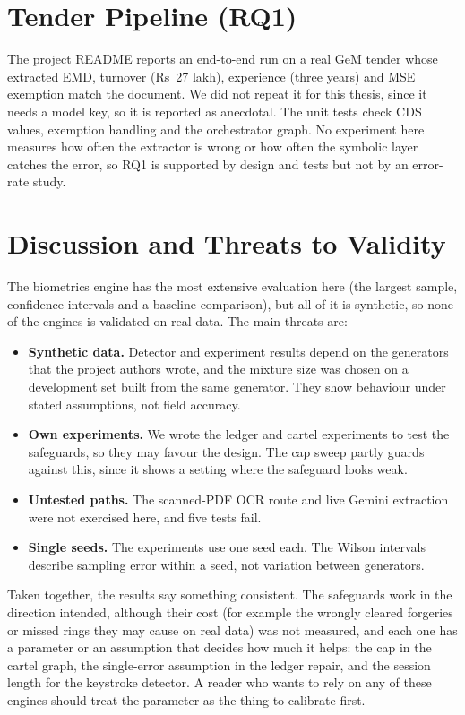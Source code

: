 \section{Tender Pipeline (RQ1)}
The project README reports an end-to-end run on a real GeM tender whose extracted EMD, turnover (Rs~27 lakh), experience (three years) and MSE exemption match the document. We did not repeat it for this thesis, since it needs a model key, so it is reported as anecdotal. The unit tests check CDS values, exemption handling and the orchestrator graph. No experiment here measures how often the extractor is wrong or how often the symbolic layer catches the error, so RQ1 is supported by design and tests but not by an error-rate study.

\section{Discussion and Threats to Validity}
The biometrics engine has the most extensive evaluation here (the largest sample, confidence intervals and a baseline comparison), but all of it is synthetic, so none of the engines is validated on real data. The main threats are:
\begin{itemize}
    \item \textbf{Synthetic data.} Detector and experiment results depend on the generators that the project authors wrote, and the mixture size was chosen on a development set built from the same generator. They show behaviour under stated assumptions, not field accuracy.
    \item \textbf{Own experiments.} We wrote the ledger and cartel experiments to test the safeguards, so they may favour the design. The cap sweep partly guards against this, since it shows a setting where the safeguard looks weak.
    \item \textbf{Untested paths.} The scanned-PDF OCR route and live Gemini extraction were not exercised here, and five tests fail.
    \item \textbf{Single seeds.} The experiments use one seed each. The Wilson intervals describe sampling error within a seed, not variation between generators.
\end{itemize}

Taken together, the results say something consistent. The safeguards work in the direction intended, although their cost (for example the wrongly cleared forgeries or missed rings they may cause on real data) was not measured, and each one has a parameter or an assumption that decides how much it helps: the cap in the cartel graph, the single-error assumption in the ledger repair, and the session length for the keystroke detector. A reader who wants to rely on any of these engines should treat the parameter as the thing to calibrate first.
